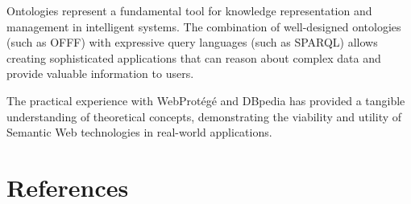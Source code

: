\documentclass[12pt,a4paper]{article}
\begin{document}
Ontologies represent a fundamental tool for knowledge representation and management in intelligent systems. The combination of well-designed ontologies (such as OFFF) with expressive query languages (such as SPARQL) allows creating sophisticated applications that can reason about complex data and provide valuable information to users.

The practical experience with WebProtégé and DBpedia has provided a tangible understanding of theoretical concepts, demonstrating the viability and utility of Semantic Web technologies in real-world applications.

\section{References}
\end{document}
